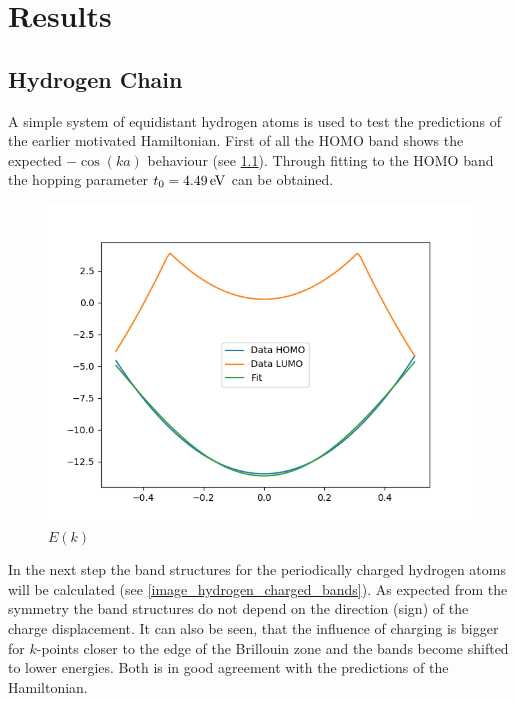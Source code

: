 \chapter{Results}
\section{Hydrogen Chain}

A simple system of equidistant hydrogen atoms is used to test the predictions of the earlier motivated Hamiltonian. First of all the HOMO band shows the expected $-\cos(ka)$ behaviour (see \cref{image_hydrogen_bandstructure}). Through fitting to the HOMO band the hopping parameter $t_0 = \unit[4.49]{eV}$ can be obtained.

\begin{figure}
	\centering
	\includegraphics[width = 12cm]{Images/Hydrogen/hydrogen_bandstructure}
	\caption{$E(k)$}
	\label{image_hydrogen_bandstructure}
\end{figure}


In the next step the band structures for the periodically charged hydrogen atoms will be calculated (see \cref{image_hydrogen_charged_bands}). As expected from the symmetry the band structures do not depend on the direction (sign) of the charge displacement. It can also be seen, that the influence of charging is bigger for $k$-points closer to the edge of the Brillouin zone and the bands become shifted to lower energies. Both is in good agreement with the predictions of the Hamiltonian.

